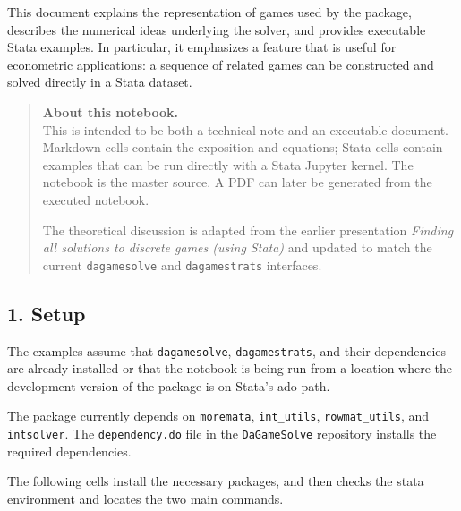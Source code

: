 \documentclass[11pt]{article}
\begin{document}
This document explains the representation of games used by the package,
describes the numerical ideas underlying the solver, and provides
executable Stata examples. In particular, it emphasizes a feature that
is useful for econometric applications: a sequence of related games can
be constructed and solved directly in a Stata dataset.

    \begin{quote}
\textbf{About this notebook.}\\
This is intended to be both a technical note and an executable document.
Markdown cells contain the exposition and equations; Stata cells contain
examples that can be run directly with a Stata Jupyter kernel. The
notebook is the master source. A PDF can later be generated from the
executed notebook.

The theoretical discussion is adapted from the earlier presentation
\emph{Finding all solutions to discrete games (using Stata)} and updated
to match the current \texttt{dagamesolve} and \texttt{dagamestrats}
interfaces.
\end{quote}

    \hypertarget{setup}{%
\subsection{1. Setup}\label{setup}}

The examples assume that \texttt{dagamesolve}, \texttt{dagamestrats},
and their dependencies are already installed or that the notebook is
being run from a location where the development version of the package
is on Stata's ado-path.

The package currently depends on \texttt{moremata}, \texttt{int\_utils},
\texttt{rowmat\_utils}, and \texttt{intsolver}. The
\texttt{dependency.do} file in the \texttt{DaGameSolve} repository
installs the required dependencies.

The following cells install the necessary packages, and then checks the
stata environment and locates the two main commands.
\end{document}
